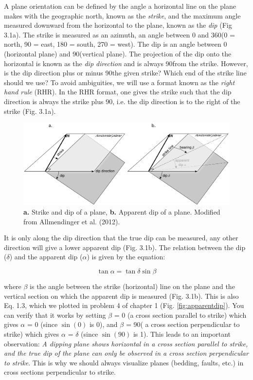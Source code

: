 \documentclass[a4paper , 12pt]{book}
\begin{document}
A plane orientation can be defined by the angle a horizontal line on the plane makes with the geographic north, known as the \textit{strike}, and the maximum angle measured downward from the horizontal to the plane, known as the \textit{dip} (Fig 3.1a). The strike is measured as an azimuth, an angle between 0 and  360\degree\space (0 = north, 90 = east, 180 = south, 270 = west). The dip is an angle between 0 (horizontal plane) and 90\degree\space (vertical plane). The projection of the dip onto the horizontal is known as the \textit{dip direction} and is always 90\degree\space from the strike. However, is the dip direction plus or minus 90\degree\space the given strike? Which end of the strike line should we use? To avoid ambiguities, we will use a format known as the \textit{right hand rule} (RHR). In the RHR format, one gives the strike such that the dip direction is always the strike plus 90\degree, i.e. the dip direction is to the right of the strike (Fig. 3.1a).

\begin{figure}[ht]
    \centering
    \includegraphics[width=13cm]{ch3f1.pdf}
    \caption{\textbf{a.} Strike and dip of a plane, \textbf{b.} Apparent dip of a plane. Modified from Allmendinger et al. (2012).}
    \label{fig:strikedip}
\end{figure}

It is only along the dip direction that the true dip can be measured, any other direction will give a lower apparent dip (Fig. 3.1b). The relation between the dip ($\delta$) and the apparent dip ($\alpha$) is given by the equation:

\begin{equation}
    \tan\alpha=\tan\delta\sin\beta
\end{equation}

where $\beta$ is the angle between the strike (horizontal) line on the plane and the vertical section on which the apparent dip is measured (Fig. 3.1b). This is also Eq. 1.3, which we plotted in problem 4 of chapter 1 (Fig. \ref{fig:apparentdip}). You can verify that it works by setting $\beta$ = 0 (a cross section parallel to strike) which gives $\alpha$ = 0 (since $\sin(0)$ is 0), and $\beta$ = 90\degree\space ( a cross section perpendicular to strike) which gives $\alpha$ = $\delta$ (since $\sin (90)$ is 1). This leads to an important observation: \textit{A dipping plane shows horizontal in a cross section parallel to strike, and the true dip of the plane can only be observed in a cross section perpendicular to strike}. This is why we should always visualize planes (bedding, faults, etc.) in cross sections perpendicular to strike.
\end{document}
